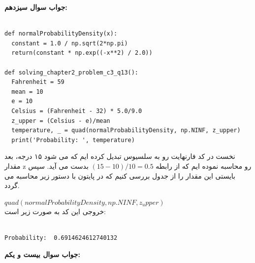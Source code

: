 \documentclass[a4paper,14pt]{article}
\begin{document}
\textbf{جواب سوال سیزدهم:}\\


		\fontsize{11}{11}\selectfont
\begin{latin}
	\begin{lstlisting}
		
def normalProbabilityDensity(x):
  constant = 1.0 / np.sqrt(2*np.pi)
  return(constant * np.exp((-x**2) / 2.0))

def solving_chapter2_problem_c3_q13():
  Fahrenheit = 59
  mean = 10
  e = 10
  Celsius = (Fahrenheit - 32) * 5.0/9.0
  z_upper = (Celsius - e)/mean
  temperature, _ = quad(normalProbabilityDensity, np.NINF, z_upper)
  print('Probability: ', temperature)
	\end{lstlisting}
\end{latin}
\fontsize{14}{14}\selectfont




نخست در کد فارنهایت رو به سلسیوس تبدیل کرده ایم که می شود ۱۵ درجه، بعد مقدار z رو محاسبه نموده ایم که از رابطه $(15 -10)/10 = 0.5$ بدست می آید.
سپس بایستی این مقدار را از جدول بررسی کنیم که در پایتون با دستور زیر محاسبه می گردد.

$quad(normalProbabilityDensity, np.NINF, z_upper)$\\

خروجی این کد به صورت زیر است:\\

\begin{latin}
	\begin{lstlisting}
		
Probability:  0.6914624612740132

	\end{lstlisting}
\end{latin}


\textbf{جواب سوال بیست و یکم:}\\
\end{document}

